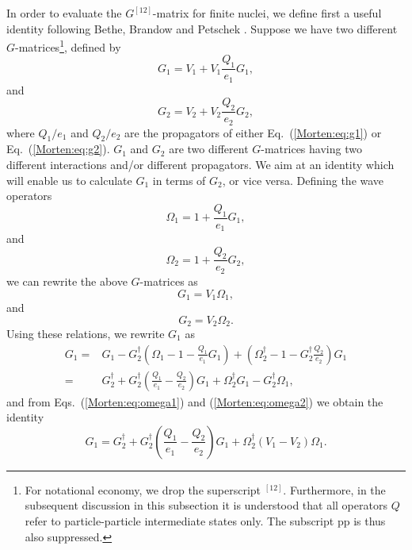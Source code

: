 In order to evaluate the $G^{[12]}$-matrix for finite nuclei,
we define first a useful identity following Bethe, Brandow and
Petschek \cite{Morten:bbp63}. Suppose we have two
different $G$-matrices\footnote{For notational economy, 
we drop the superscript $^{[12]}$. Furthermore, 
in the subsequent discussion in 
this subsection it is understood that all operators $Q$ 
refer to particle-particle intermediate states only. The subscript
$\mathrm{pp}$ is thus also suppressed.}, defined by
\begin{equation}
    G_1=V_1+V_1\frac{Q_1}{e_1}G_1,
\end{equation}
and
\begin{equation}
    G_2=V_2+V_2\frac{Q_2}{e_2}G_2,
\end{equation}
where $Q_1/e_1$ and $Q_2/e_2$ are the propagators of
either Eq.~(\ref{Morten:eq:g1}) or Eq.~(\ref{Morten:eq:g2}). $G_1$ and $G_2$
are two different $G$-matrices having two different interactions
and/or different propagators. We aim at an identity
which will enable us to calculate $G_1$ in terms of $G_2$,
or vice versa.
Defining the wave operators
\begin{equation}
    \Omega_1=1+\frac{Q_1}{e_1}G_1,
\end{equation}
and
\begin{equation}
    \Omega_2=1+\frac{Q_2}{e_2}G_2,
\end{equation}
we can rewrite the above $G$-matrices as
\begin{equation}
    G_1=V_1\Omega_1,
    \label{Morten:eq:omega1}
\end{equation}
and
\begin{equation}
    G_2=V_2\Omega_2.
    \label{Morten:eq:omega2}
\end{equation}
Using these relations, we rewrite $G_1$ as
\begin{eqnarray}
   G_1=&G_1 -{\displaystyle 
         G_2^{\dagger}\left(\Omega_1-1-\frac{Q_1}{e_1}G_1\right)
        +\left(\Omega_2^{\dagger}-1-G_2^{\dagger}\frac{Q_2}{e_2}\right)G_1} 
         \nonumber \\
       =&{\displaystyle G_2^{\dagger} +G_2^{\dagger}\left(\frac{Q_1}{e_1}-
        \frac{Q_2}{e_2}\right)G_1
        +\Omega_2^{\dagger}G_1 -G_2^{\dagger}\Omega_1} ,
\end{eqnarray}
and from Eqs.~(\ref{Morten:eq:omega1}) and (\ref{Morten:eq:omega2}) we obtain
the identity
\begin{equation}
        G_1=G_2^{\dagger} +G_2^{\dagger}
        \left(\frac{Q_1}{e_1}-\frac{Q_2}{e_2}\right)G_1
        +\Omega_2^{\dagger}(V_1-V_2)\Omega_1.
        \label{Morten:eq:gidentity}
\end{equation}
